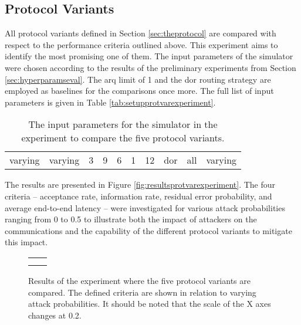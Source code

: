\subsection{Protocol Variants}\label{subsec:protocolvariantseval}
All protocol variants defined in Section \ref{sec:theprotocol} are compared with respect to the performance criteria outlined above. This experiment
aims to identify the most promising one of them. The input parameters of the simulator were chosen according to the results of the preliminary
experiments from Section \ref{sec:hyperparamseval}. The \gls{arq} limit of 1 and the \gls{dor} routing strategy are employed as baselines for the
comparisons once more. The full list of input parameters is given in Table \vref{tab:setupprotvarexperiment}.

\begin{table}
    \centering
    \begin{tabulary}{\textwidth}{C|C|C|C|C|C|C|C|C|C}
        \pProtVar{} & \pNCMode{} & \pEncMods{} & \pAuthMods{} & \pRQSize{} & \pARQLimit{} & \pARQTimeout{} & \pRStrat{} & \pAttackerSet{} & \pAttackProb{} \\\hline
        varying & varying & 3 & 9 & 6 & 1 & 12 & \gls{dor} & all & varying \\
    \end{tabulary}
    \caption[Input parameters for protocol variant experiment]{The input parameters for the simulator in the experiment to compare the five protocol
    variants.}
    \label{tab:setupprotvarexperiment}
\end{table}

The results are presented in Figure \vref{fig:resultsprotvarexperiment}. The four criteria -- acceptance rate, information rate, residual error
probability, and average end-to-end latency -- were investigated for various attack probabilities ranging from 0 to 0.5 to illustrate both the impact
of attackers on the communications and the capability of the different protocol variants to mitigate this impact.

\begin{figure}
    \centering
    \begin{tabular}{cc}
         &  \\
         & 
    \end{tabular}
    \caption[Results for protocol variant experiment]{Results of the experiment where the five protocol variants are compared. The defined criteria
    are shown in relation to varying attack probabilities. It should be noted that the scale of the X axes changes at 0.2.}
    \label{fig:resultsprotvarexperiment}
\end{figure}

